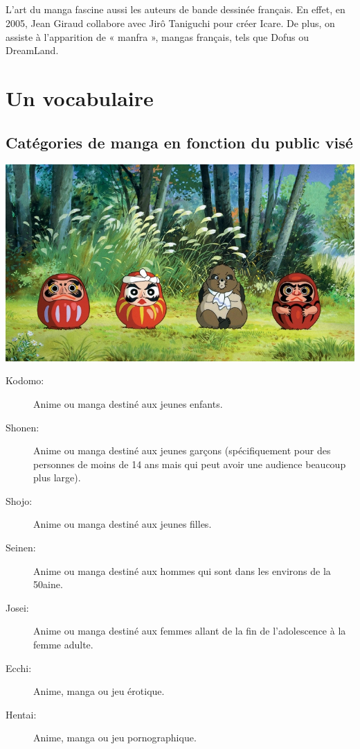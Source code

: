 \paragraph{}
L’art du manga fascine aussi les auteurs de bande dessinée français. En effet, en 2005, Jean Giraud collabore avec Jirô Taniguchi pour créer Icare. De plus, on assiste à l’apparition de « manfra », mangas français, tels que Dofus ou DreamLand.

\chapter{Un vocabulaire}

\section{Catégories de manga en fonction du public visé}

\begin{center}
	\includegraphics[scale=0.5]{Kodomo.jpg}
\end{center}

\begin{description}
	\item[Kodomo:] Anime ou manga destiné aux jeunes enfants.
	\item[Shonen:] Anime ou manga destiné aux jeunes garçons (spécifiquement
		pour des personnes de moins de 14 ans mais qui peut avoir une audience
		beaucoup plus large).
	\item[Shojo:] Anime ou manga destiné aux jeunes filles.
	\item[Seinen:] Anime ou manga destiné aux hommes qui sont dans les environs
		de la 50aine.
	\item[Josei:] Anime ou manga destiné aux femmes allant de la fin de
		l'adolescence à la femme adulte.
	\item[Ecchi:] Anime, manga ou jeu érotique.
	\item[Hentai:] Anime, manga ou jeu pornographique.
\end{description}

